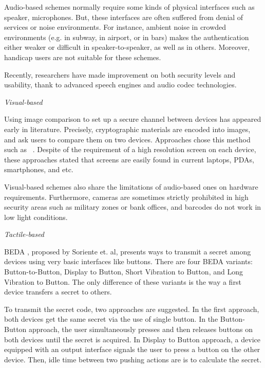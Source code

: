 Audio-based schemes normally require some kinds of physical interfaces such as speaker, microphones. But, these interfaces are often suffered from denial of services or noise environments. For instance, ambient noise in crowded environments (e.g. in subway, in airport, or in bars) makes the authentication either weaker or difficult in speaker-to-speaker, as well as in others. Moreover, handicap users are not suitable for these schemes. 

Recently, researchers have made improvement on both security levels and usability, thank to advanced speech engines and audio codec technologies. 

\emph{Visual-based}

Using image comparison to set up a secure channel between devices has appeared early in literature. Precisely, cryptographic materials are encoded into images, and ask users to compare them on two devices. Approaches chose this method such as ~\cite{Goodrich:2009:UAS:1509221.1509226,1425062,Perrig99hashvisualization,Ellison:2003:PSG:950191.950195,1624021}. Despite of the requirement of a high resolution screen on each device, these approaches stated that screens are easily found in current laptops, PDAs, smartphones, and etc. 

Visual-based schemes also share the limitations of audio-based ones on hardware requirements. Furthermore, cameras are sometimes strictly prohibited in high security areas such as military zones or bank offices, and barcodes do not work in low light conditions. 

\emph{Tactile-based}

BEDA \cite{Soriente07beda:button-enabled}, proposed by Soriente et. al, presents ways to transmit a secret among devices using very basic interfaces like buttons. There are four BEDA variants: Button-to-Button, Display to Button, Short Vibration to Button, and Long Vibration to Button. The only difference of these variants is the way a first device transfers a secret to others. 

To transmit the secret code, two approaches are suggested. In the first approach, both devices get the same secret via the use of single button. In the Button-Button approach, the user simultaneously presses and then releases buttons on both devices until the secret is acquired. In Display to Button approach, a device equipped with an output interface signals the user to press a button on the other device. Then, idle time between two pushing actions are is to calculate the secret. 


